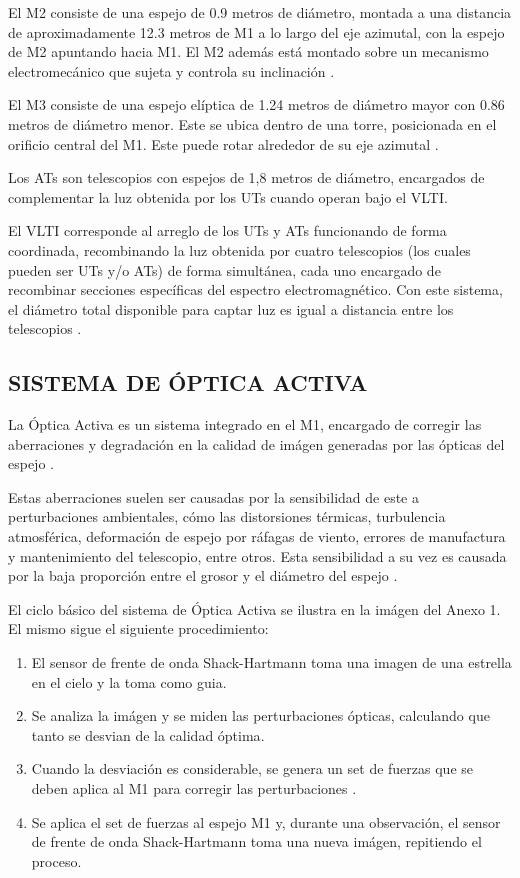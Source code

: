 El M2 consiste de una espejo de 0.9 metros de diámetro, montada a una distancia de aproximadamente 12.3 metros de M1 a lo largo del eje azimutal, con la espejo de M2 apuntando hacia M1. El M2 además está montado sobre un mecanismo electromecánico que sujeta y controla su inclinación \cite{eso2011m2}.

El M3 consiste de una espejo elíptica de 1.24 metros de diámetro mayor con 0.86 metros de diámetro menor. Este se ubica dentro de una torre, posicionada en el orificio central del M1. Este puede rotar alrededor de su eje azimutal \cite{eso2011m1}.

Los ATs son telescopios con espejos de 1,8 metros de diámetro, encargados de complementar la luz obtenida por los UTs cuando operan bajo el VLTI.

El VLTI corresponde al arreglo de los UTs y ATs funcionando de forma coordinada, recombinando la luz obtenida por cuatro telescopios (los cuales pueden ser UTs y/o ATs) de forma simultánea, cada uno encargado de recombinar secciones específicas del espectro electromagnético. Con este sistema, el diámetro total disponible para captar luz es igual a distancia entre los telescopios \cite{eso1998vlt}.

\subsection{SISTEMA DE ÓPTICA ACTIVA}
La Óptica Activa es un sistema integrado en el M1, encargado de corregir las aberraciones y degradación en la calidad de imágen generadas por las ópticas del espejo \cite{eso1998vlt}. 

Estas aberraciones suelen ser causadas por la sensibilidad de este a perturbaciones ambientales, cómo las distorsiones térmicas, turbulencia atmosférica, deformación de espejo por ráfagas de viento, errores de manufactura y mantenimiento del telescopio, entre otros. Esta sensibilidad a su vez es causada por la baja proporción entre el grosor y el diámetro del espejo \cite{wilson1987active}.

El ciclo básico del sistema de Óptica Activa se ilustra en la imágen del Anexo 1. El mismo sigue el siguiente procedimiento:

\begin{enumerate}
    \item El sensor de frente de onda Shack-Hartmann toma una imagen de una estrella en el cielo y la toma como guia\cite{eso1998vlt}.

    \item Se analiza la imágen y se miden las perturbaciones ópticas, calculando que tanto se desvian de la calidad óptima\cite{wilson1987active}.

    \item Cuando la desviación es considerable, se genera un set de fuerzas que se deben aplica al M1 para corregir las perturbaciones \cite{wilson1987active}.

    \item Se aplica el set de fuerzas al espejo M1 y, durante una observación, el sensor de frente de onda Shack-Hartmann toma una nueva imágen, repitiendo el proceso\cite{wilson1987active}.
\end{enumerate}

